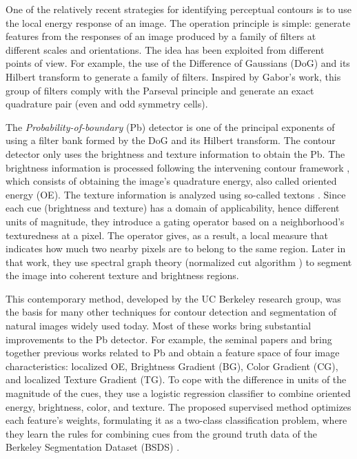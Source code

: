 One of the relatively recent strategies for identifying perceptual contours is to use the local energy response of an image. The operation principle is simple: generate features from the responses of an image produced by a family of filters at different scales and orientations. The idea has been exploited from different points of view. For example, the use of the Difference of Gaussians (DoG) and its Hilbert transform \citep{Morrone.Owens:PR:1987, Morrone.Burr.ea:RSL:1988} to generate a family of filters. Inspired by Gabor's work, this group of filters comply with the Parseval principle and generate an exact quadrature pair (even and odd symmetry cells). 

The \textit{Probability-of-boundary} (Pb) detector \citep{Malik.Belongie.ea:IJCV:2001} is one of the principal exponents of using a filter bank formed by the DoG and its Hilbert transform. The contour detector only uses the brightness and texture information to obtain the Pb. The brightness information is processed following the intervening contour framework \citep{Leung.Malik:ECCV:1998}, which consists of obtaining the image's quadrature energy, also called oriented energy (OE). The texture information is analyzed using so-called textons \citep{Malik.Belongie.ea:ICCV:1999}. Since each cue (brightness and texture) has a domain of applicability, hence different units of magnitude, they introduce a gating operator based on a neighborhood's texturedness at a pixel. The operator gives, as a result, a local measure that indicates how much two nearby pixels are to belong to the same region. Later in that work, they use spectral graph theory (normalized cut algorithm \citep{JianboShi.Malik:PAMI:2000}) to segment the image into coherent texture and brightness regions. 

This contemporary method, developed by the UC Berkeley research group, was the basis for many other techniques for contour detection and segmentation of natural images widely used today. Most of these works bring substantial improvements to the Pb detector. For example, the seminal papers \citep{Martin.Fowlkes.ea:NIPS:2002} and \citep{Martin.Fowlkes.ea:PAMI:2004} bring together previous works related to Pb and obtain a feature space of four image characteristics: localized OE, Brightness Gradient (BG), Color Gradient (CG), and localized Texture Gradient (TG). To cope with the difference in units of the magnitude of the cues, they use a logistic regression classifier to combine oriented energy, brightness, color, and texture. The proposed supervised method optimizes each feature's weights, formulating it as a two-class classification problem, where they learn the rules for combining cues from the ground truth data of the Berkeley Segmentation Dataset (BSDS) \citep{Martin.Fowlkes.ea:ICCV:2001}.

